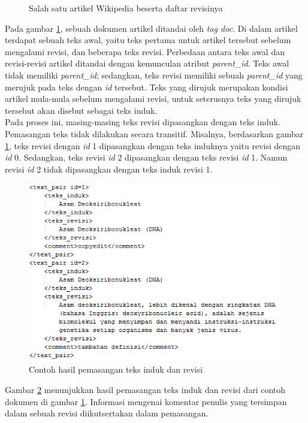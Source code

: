 \begin{enumerate}
\begin{figure}
		\caption{Salah satu artikel Wikipedia beserta daftar revisinya}
		\label{fig:revisi_induk}
	\end{figure}
	Pada gambar \ref{fig:revisi_induk}, sebuah dokumen artikel ditandai oleh \textit{tag doc}. Di dalam  artikel terdapat sebuah teks awal, yaitu teks pertama untuk artikel tersebut sebelum mengalami revisi, dan beberapa teks revisi. Perbedaan antara teks awal dan revisi-revisi artikel ditandai dengan kemunculan atribut \textit{parent\_id}. Teks awal tidak memiliki \textit{parent\_id}; sedangkan, teks revisi memiliki sebuah \textit{parent\_id} yang merujuk pada teks dengan \textit{id} tersebut. Teks yang dirujuk merupakan kondisi artikel mula-mula sebelum mengalami revisi, untuk seterusnya teks yang dirujuk tersebut akan disebut sebagai teks induk. 
	\\Pada proses ini, masing-masing teks revisi dipasangkan dengan teks induk. Pemasangan teks tidak dilakukan secara transitif. Misalnya, berdasarkan gambar \ref{fig:revisi_induk}, teks revisi dengan \textit{id} 1 dipasangkan dengan teks induknya yaitu revisi dengan \textit{id} 0. Sedangkan, teks revisi \textit{id} 2 dipasangkan dengan teks revisi \textit{id} 1. Namun revisi \textit{id} 2 tidak dipasangkan dengan teks induk revisi 1. 
	\begin{figure}
		\centering
		\includegraphics[width=0.85\linewidth]{pics/hasil-pemasangan}
		\caption{Contoh hasil pemasangan teks induk dan revisi}
		\label{fig:hasil-pemasangan}
	\end{figure}
	Gambar \ref{fig:hasil-pemasangan} menunjukkan hasil pemasangan teks induk dan revisi dari contoh dokumen di gambar \ref{fig:revisi_induk}. Informasi mengenai komentar penulis yang tersimpan dalam sebuah revisi diikutsertakan dalam pemasangan.
	

\end{enumerate}
